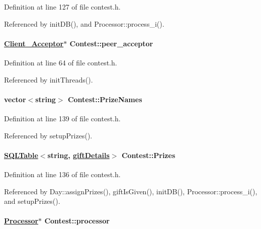 Definition at line 127 of file contest.h.

Referenced by init\-DB(), and Processor::process\_\-i().\hypertarget{classContest_Contesto2}{
\paragraph[peer\_\-acceptor]{\setlength{\rightskip}{0pt plus 5cm}\hyperlink{classClient__Acceptor}{Client\_\-Acceptor}$\ast$ Contest::peer\_\-acceptor}\hfill}
\label{classContest_Contesto2}




Definition at line 64 of file contest.h.

Referenced by init\-Threads().\hypertarget{classContest_Contestm12}{
\paragraph[PrizeNames]{\setlength{\rightskip}{0pt plus 5cm}vector$<$string$>$ Contest::Prize\-Names}\hfill}
\label{classContest_Contestm12}




Definition at line 139 of file contest.h.

Referenced by setup\-Prizes().\hypertarget{classContest_Contestm11}{
\paragraph[Prizes]{\setlength{\rightskip}{0pt plus 5cm}\hyperlink{classSQLTable}{SQLTable}$<$string, \hyperlink{classgiftDetails}{gift\-Details}$>$ Contest::Prizes}\hfill}
\label{classContest_Contestm11}




Definition at line 136 of file contest.h.

Referenced by Day::assign\-Prizes(), gift\-Is\-Given(), init\-DB(), Processor::process\_\-i(), and setup\-Prizes().\hypertarget{classContest_Contestm15}{
\paragraph[processor]{\setlength{\rightskip}{0pt plus 5cm}\hyperlink{classProcessor}{Processor}$\ast$ Contest::processor}\hfill}
\label{classContest_Contestm15}




